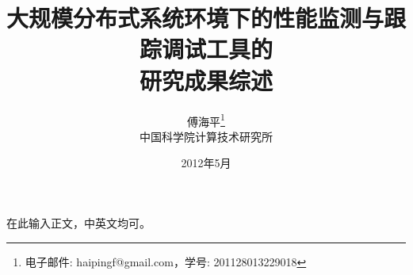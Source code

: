 \documentclass[a4paper, 11pt]{article}
\newcommand{\xiaosihao}{\fontsize{12pt}{\baselineskip}\selectfont}
\begin{document}
\begin{CJK}{UTF8}{gbsn}

\newtheorem{example}{例}             %
\newtheorem{algorithm}{算法}
\newtheorem{theorem}{定理}[section]  %
\newtheorem{definition}{定义}
\newtheorem{axiom}{公理}
\newtheorem{property}{性质}
\newtheorem{proposition}{命题}
\newtheorem{lemma}{引理}
\newtheorem{corollary}{推论}
\newtheorem{remark}{注解}
\newtheorem{condition}{条件}
\newtheorem{conclusion}{结论}
\newtheorem{assumption}{假设}

\renewcommand{\contentsname}{目录}  %
\renewcommand{\abstractname}{摘要}  %
\renewcommand{\refname}{参考文献}   %
\renewcommand{\indexname}{索引}
\renewcommand{\figurename}{图}
\renewcommand{\tablename}{表}
\renewcommand{\appendixname}{附录}
\renewcommand{\algorithm}{算法}


\title{大规模分布式系统环境下的性能监测与跟踪调试工具的\\研究成果综述}
\author{傅海平\footnote{电子邮件: haipingf@gmail.com，学号: 201128013229018}\\[2ex]
\xiaosihao 中国科学院计算技术研究所\\[2ex]
}
\date{2012年5月}


\maketitle

\tableofcontents
\newpage
在此输入正文，中英文均可。
\end{CJK}
\end{document}
